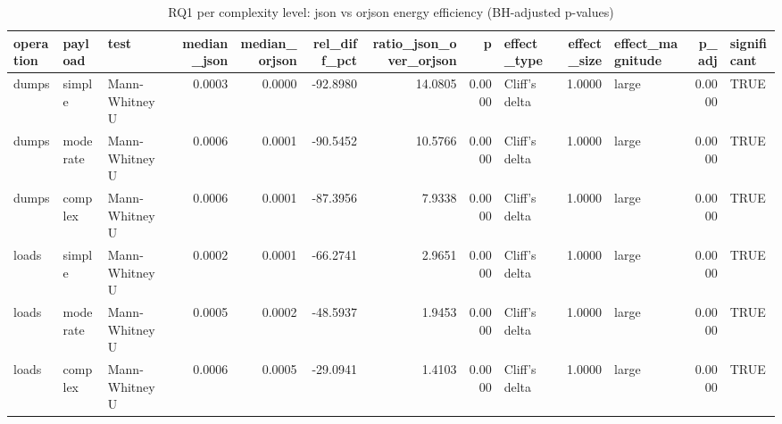 \begin{table}[ht]
\centering
\begin{tabular}{lllrrrrrlrlrl}
  \toprule
operation & payload & test & median\_json & median\_orjson & rel\_diff\_pct & ratio\_json\_over\_orjson & p & effect\_type & effect\_size & effect\_magnitude & p\_adj & significant \\ 
  \midrule
dumps & simple & Mann-Whitney U & 0.0003 & 0.0000 & -92.8980 & 14.0805 & 0.0000 & Cliff's delta & 1.0000 & large & 0.0000 & TRUE \\ 
  dumps & moderate & Mann-Whitney U & 0.0006 & 0.0001 & -90.5452 & 10.5766 & 0.0000 & Cliff's delta & 1.0000 & large & 0.0000 & TRUE \\ 
  dumps & complex & Mann-Whitney U & 0.0006 & 0.0001 & -87.3956 & 7.9338 & 0.0000 & Cliff's delta & 1.0000 & large & 0.0000 & TRUE \\ 
  loads & simple & Mann-Whitney U & 0.0002 & 0.0001 & -66.2741 & 2.9651 & 0.0000 & Cliff's delta & 1.0000 & large & 0.0000 & TRUE \\ 
  loads & moderate & Mann-Whitney U & 0.0005 & 0.0002 & -48.5937 & 1.9453 & 0.0000 & Cliff's delta & 1.0000 & large & 0.0000 & TRUE \\ 
  loads & complex & Mann-Whitney U & 0.0006 & 0.0005 & -29.0941 & 1.4103 & 0.0000 & Cliff's delta & 1.0000 & large & 0.0000 & TRUE \\ 
   \bottomrule
\end{tabular}
\caption{RQ1 per complexity level: json vs orjson energy efficiency (BH-adjusted p-values)} 
\label{tab:rq1_pairwise}
\end{table}
